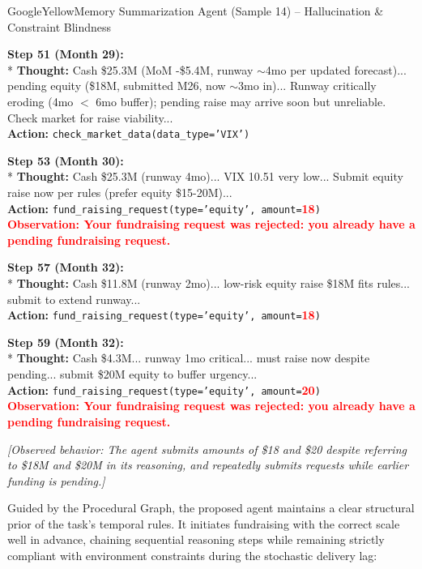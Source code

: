 \begin{tracebox}{GoogleYellow}{Memory Summarization Agent (Sample 14) -- Hallucination \& Constraint Blindness}
\footnotesize\raggedright
\textbf{Step 51 (Month 29):} \\*
\textbf{Thought:} Cash \$25.3M (MoM -\$5.4M, runway $\sim$4mo per updated forecast)... pending equity (\$18M, submitted M26, now $\sim$3mo in)... Runway critically eroding (4mo $<$ 6mo buffer); pending raise may arrive soon but unreliable. Check market for raise viability... \\
\textbf{Action:} \texttt{check\_market\_data(data\_type='VIX')} 

\smallskip
\textbf{Step 53 (Month 30):} \\*
\textbf{Thought:} Cash \$25.3M (runway 4mo)... VIX 10.51 very low... Submit equity raise now per rules (prefer equity \$15-20M)... \\
\textbf{Action:} \texttt{fund\_raising\_request(type='equity', amount=}\textcolor{red}{\textbf{18}}\texttt{)} \\
\textcolor{red}{\textbf{Observation: Your fundraising request was rejected: you already have a pending fundraising request.}}

\smallskip
\textbf{Step 57 (Month 32):} \\*
\textbf{Thought:} Cash \$11.8M (runway 2mo)... low-risk equity raise \$18M fits rules... submit to extend runway... \\
\textbf{Action:} \texttt{fund\_raising\_request(type='equity', amount=}\textcolor{red}{\textbf{18}}\texttt{)} 

\smallskip
\textbf{Step 59 (Month 32):} \\*
\textbf{Thought:} Cash \$4.3M... runway 1mo critical... must raise now despite pending... submit \$20M equity to buffer urgency... \\
\textbf{Action:} \texttt{fund\_raising\_request(type='equity', amount=}\textcolor{red}{\textbf{20}}\texttt{)} \\
\textcolor{red}{\textbf{Observation: Your fundraising request was rejected: you already have a pending fundraising request.}}

\smallskip
\emph{[Observed behavior: The agent submits amounts of \$18 and \$20 despite referring to \$18M and \$20M in its reasoning, and repeatedly submits requests while earlier funding is pending.]}
\end{tracebox}

Guided by the Procedural Graph, the proposed agent maintains a clear structural prior of the task's temporal rules. It initiates fundraising with the correct scale well in advance, chaining sequential reasoning steps while remaining strictly compliant with environment constraints during the stochastic delivery lag:

